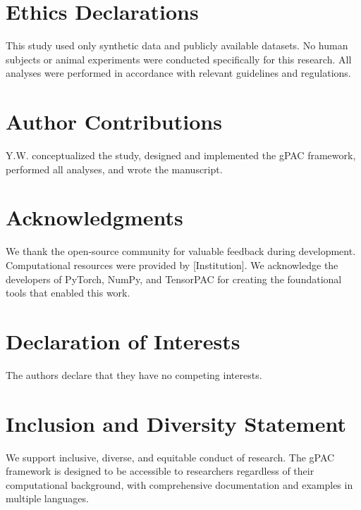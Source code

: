
\section*{Ethics Declarations}
This study used only synthetic data and publicly available datasets. No human subjects or animal experiments were conducted specifically for this research. All analyses were performed in accordance with relevant guidelines and regulations.
\label{ethics declarations}

\section*{Author Contributions}
Y.W. conceptualized the study, designed and implemented the gPAC framework, performed all analyses, and wrote the manuscript.
\label{author contributions}

\section*{Acknowledgments}
We thank the open-source community for valuable feedback during development. Computational resources were provided by [Institution]. We acknowledge the developers of PyTorch, NumPy, and TensorPAC for creating the foundational tools that enabled this work.
\label{acknowledgments}

\section*{Declaration of Interests}
The authors declare that they have no competing interests.
\label{declaration of interests}

\section*{Inclusion and Diversity Statement}
We support inclusive, diverse, and equitable conduct of research. The gPAC framework is designed to be accessible to researchers regardless of their computational background, with comprehensive documentation and examples in multiple languages.
\label{inclusion and diversity statement}

